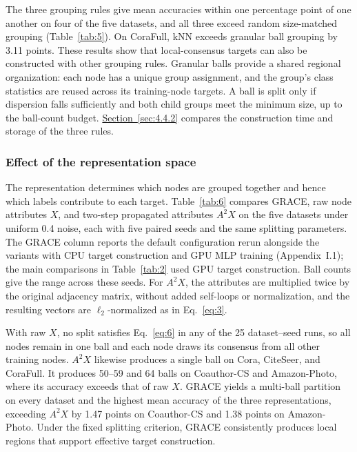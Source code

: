 \documentclass[10pt,letterpaper,nopreprintline]{elsarticle}
\theoremstyle{plain}
\begin{document}


The three grouping rules give mean accuracies within one percentage point of one another on four of the five datasets, and all three exceed random size-matched grouping (Table~\ref{tab:5}). On CoraFull, kNN exceeds granular ball grouping by 3.11 points. These results show that local-consensus targets can also be constructed with other grouping rules. Granular balls provide a shared regional organization: each node has a unique group assignment, and the group's class statistics are reused across its training-node targets. A ball is split only if dispersion falls sufficiently and both child groups meet the minimum size, up to the ball-count budget. \hyperref[sec:4.4.2]{Section~\ref*{sec:4.4.2}} compares the construction time and storage of the three rules.

\subsubsection{Effect of the representation space}\label{sec:4.3.3}

The representation determines which nodes are grouped together and hence which labels contribute to each target. Table~\ref{tab:6} compares GRACE, raw node attributes \(X\), and two-step propagated attributes \(A^2X\) on the five datasets under uniform 0.4 noise, each with five paired seeds and the same splitting parameters. The GRACE column reports the default configuration rerun alongside the variants with CPU target construction and GPU MLP training (Appendix~I.1); the main comparisons in Table~\ref{tab:2} used GPU target construction. Ball counts give the range across these seeds. For \(A^2X\), the attributes are multiplied twice by the original adjacency matrix, without added self-loops or normalization, and the resulting vectors are \(\ell_2\)-normalized as in Eq.~\eqref{eq:3}.



With raw \(X\), no split satisfies Eq.~\eqref{eq:6} in any of the 25 dataset--seed runs, so all nodes remain in one ball and each node draws its consensus from all other training nodes. \(A^2X\) likewise produces a single ball on Cora, CiteSeer, and CoraFull. It produces 50--59 and 64 balls on Coauthor-CS and Amazon-Photo, where its accuracy exceeds that of raw \(X\). GRACE yields a multi-ball partition on every dataset and the highest mean accuracy of the three representations, exceeding \(A^2X\) by 1.47 points on Coauthor-CS and 1.38 points on Amazon-Photo. Under the fixed splitting criterion, GRACE consistently produces local regions that support effective target construction.
\end{document}

